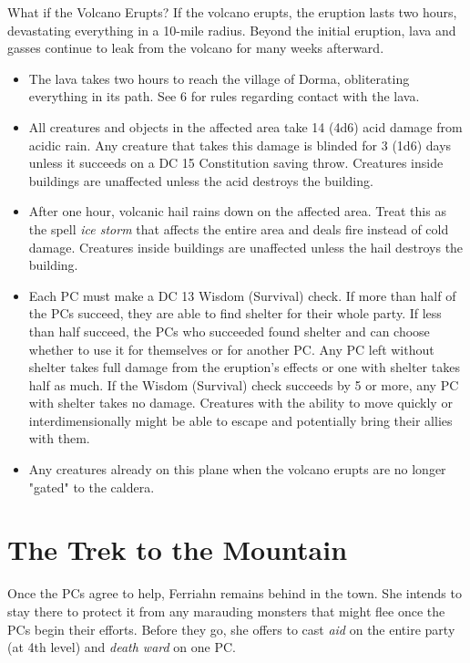 \documentclass[10pt,a4paper,twoside,bg=print,twocolumn,openany,nodeprecatedcode]{dndbook}
\begin{document}
\begin{DndSidebar}[float=!b]{What if the Volcano Erupts?}
If the volcano erupts, the eruption lasts two hours, devastating everything in a 10-mile radius. Beyond the initial eruption, lava and gasses continue to leak from the volcano for many weeks afterward.




\begin{itemize}
\item The lava takes two hours to reach the village of Dorma, obliterating everything in its path. See 6 for rules regarding contact with the lava.
\item All creatures and objects in the affected area take 14 (4d6) acid damage from acidic rain. Any creature that takes this damage is blinded for 3 (1d6) days unless it succeeds on a DC 15 Constitution saving throw. Creatures inside buildings are unaffected unless the acid destroys the building.
\item After one hour, volcanic hail rains down on the affected area. Treat this as the spell \textit{ice storm} that affects the entire area and deals fire instead of cold damage. Creatures inside buildings are unaffected unless the hail destroys the building.
\item Each PC must make a DC 13 Wisdom (Survival) check. If more than half of the PCs succeed, they are able to find shelter for their whole party. If less than half succeed, the PCs who succeeded found shelter and can choose whether to use it for themselves or for another PC. Any PC left without shelter takes full damage from the eruption's effects or one with shelter takes half as much. If the Wisdom (Survival) check succeeds by 5 or more, any PC with shelter takes no damage. Creatures with the ability to move quickly or interdimensionally might be able to escape and potentially bring their allies with them.
\item Any creatures already on this plane when the volcano erupts are no longer "gated" to the caldera.
\end{itemize}



\end{DndSidebar}

\section{The Trek to the Mountain}
Once the PCs agree to help, Ferriahn remains behind in the town. She intends to stay there to protect it from any marauding monsters that might flee once the PCs begin their efforts. Before they go, she offers to cast \textit{aid} on the entire party (at 4th level) and \textit{death ward} on one PC.
\end{document}
